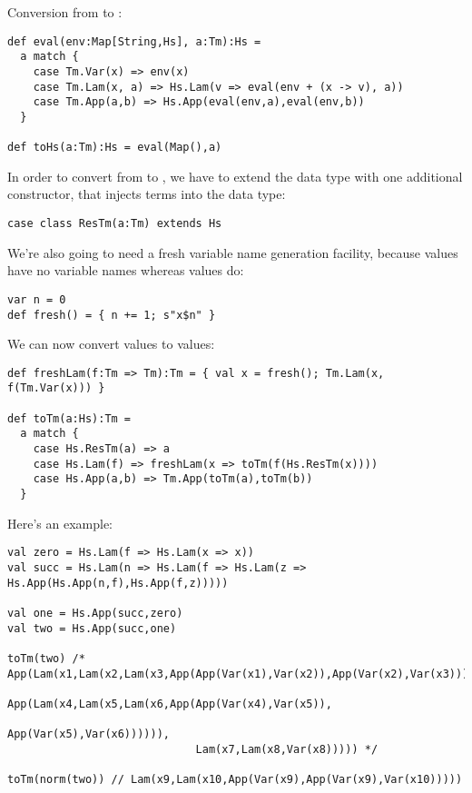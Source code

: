 Conversion from  to :

\begin{lstlisting}
def eval(env:Map[String,Hs], a:Tm):Hs =
  a match {
    case Tm.Var(x) => env(x)
    case Tm.Lam(x, a) => Hs.Lam(v => eval(env + (x -> v), a))
    case Tm.App(a,b) => Hs.App(eval(env,a),eval(env,b))
  }

def toHs(a:Tm):Hs = eval(Map(),a)
\end{lstlisting}

In order to convert from  to , we have to extend the  data type with one additional constructor, that injects  terms into the  data type:

\begin{lstlisting}
case class ResTm(a:Tm) extends Hs
\end{lstlisting}

We're also going to need a fresh variable name generation facility, because  values have no variable names whereas  values do:

\begin{lstlisting}
var n = 0
def fresh() = { n += 1; s"x$n" }
\end{lstlisting}

We can now convert  values to  values:

\begin{lstlisting}
def freshLam(f:Tm => Tm):Tm = { val x = fresh(); Tm.Lam(x, f(Tm.Var(x))) }

def toTm(a:Hs):Tm =
  a match {
    case Hs.ResTm(a) => a
    case Hs.Lam(f) => freshLam(x => toTm(f(Hs.ResTm(x))))
    case Hs.App(a,b) => Tm.App(toTm(a),toTm(b))
  }
\end{lstlisting}

Here's an example:

\begin{lstlisting}
val zero = Hs.Lam(f => Hs.Lam(x => x))
val succ = Hs.Lam(n => Hs.Lam(f => Hs.Lam(z => Hs.App(Hs.App(n,f),Hs.App(f,z)))))

val one = Hs.App(succ,zero)
val two = Hs.App(succ,one)

toTm(two) /* App(Lam(x1,Lam(x2,Lam(x3,App(App(Var(x1),Var(x2)),App(Var(x2),Var(x3)))))),
                       App(Lam(x4,Lam(x5,Lam(x6,App(App(Var(x4),Var(x5)),
                                                         App(Var(x5),Var(x6)))))),
                             Lam(x7,Lam(x8,Var(x8))))) */

toTm(norm(two)) // Lam(x9,Lam(x10,App(Var(x9),App(Var(x9),Var(x10)))))
\end{lstlisting}

